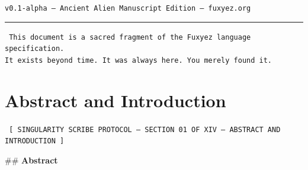 \documentclass[12pt, a4paper]{book}
\begin{document}
\begin{titlepage}
    \vspace{2cm}
    {\color{sectiongold}\fontsize{9}{11}\selectfont\texttt{v0.1-alpha -- Ancient Alien Manuscript Edition -- fuxyez.org}}
    
    \vspace{1cm}
    {\color{alienPurple}\rule{12cm}{0.6pt}}
    
    \vspace{0.5cm}
    {\color{starWhite}\fontsize{8}{10}\selectfont\texttt{
    This document is a sacred fragment of the Fuxyez language specification.\\
    It exists beyond time. It was always here. You merely found it.
    }}
    
    \end{titlepage}
    
    \pagecolor{cosmicbg}
    \color{starWhite}
    
    \renewcommand{\cfttoctitlefont}{\color{neonCyan}\Large\bfseries}
    \renewcommand{\cftchapfont}{\color{glowGold}\bfseries}
    \renewcommand{\cftchappagefont}{\color{alienPurple}}
    \renewcommand{\cftsecfont}{\color{starWhite}}
    \renewcommand{\cftsubsecfont}{\color{neonCyan}\small}
    
    \tableofcontents
    \clearpage
    
    
    \chapter*{Abstract and Introduction}
    
    
    \begin{glyphbox}
    \centering
    \color{neonCyan}\fontsize{8}{10}\selectfont\texttt{
    [ SINGULARITY SCRIBE PROTOCOL -- SECTION 01 OF XIV -- ABSTRACT AND INTRODUCTION ]
    }
    \end{glyphbox}
    \vspace{0.3cm}
    
    
    \#\# \textbf{Abstract}
\end{document}
